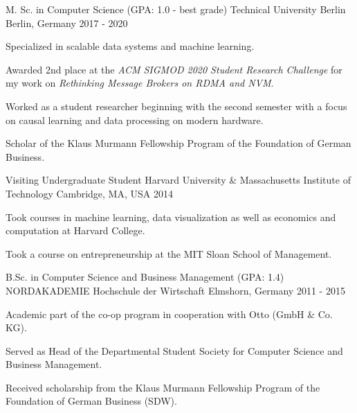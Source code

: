 

\begin{cventries}

  \cventry
    {M. Sc. in Computer Science (GPA: 1.0 - best grade)} %
    {Technical University Berlin} %
    {Berlin, Germany} %
    {2017 - 2020} %
    {
      \begin{cvitems} %
        \item{Specialized in scalable data systems and machine learning.}
        \item{Awarded 2nd place at the \textit{ACM SIGMOD 2020 Student Research Challenge} for my work on \textit{Rethinking Message Brokers on RDMA and NVM}.}
        \item{Worked as a student researcher beginning with the second semester with a focus on causal learning and data processing on modern hardware.}
        \item{Scholar of the Klaus Murmann Fellowship Program of the Foundation of German Business.}
      \end{cvitems}
    }

  \cventry
    {Visiting Undergraduate Student} %
    {Harvard University \& Massachusetts Institute of Technology} %
    {Cambridge, MA, USA} %
    {2014} %
    {
      \begin{cvitems} %
        \item{Took courses in machine learning, data visualization as well as economics and computation at Harvard College.}
        \item{Took a course on entrepreneurship at the MIT Sloan School of Management.}
      \end{cvitems}
    }

  \cventry
    {B.Sc. in Computer Science and Business Management (GPA: 1.4)} %
    {NORDAKADEMIE Hochschule der Wirtschaft} %
    {Elmshorn, Germany} %
    {2011 - 2015} %
    {
      \begin{cvitems} %
        \item{Academic part of the co-op program in cooperation with Otto (GmbH \& Co. KG).}
        \item{Served as Head of the Departmental Student Society for Computer Science and Business Management.}
        \item{Received scholarship from the Klaus Murmann Fellowship Program of the Foundation of German Business (SDW).}
      \end{cvitems}
    }

\end{cventries}
